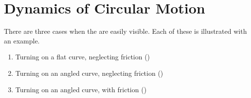 \section{Dynamics of Circular Motion}\label{sec:Dynamics Circular Motion}
There are three cases when the  are easily visible.
Each of these is illustrated with an example.
\begin{enumerate}
  \item Turning on a flat curve, neglecting friction ()
  \item Turning on an angled curve, neglecting friction ()
  \item Turning on an angled curve, with friction ()
\end{enumerate}

